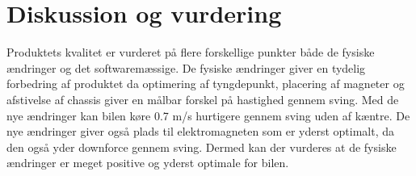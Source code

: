 \section{Diskussion og vurdering}
Produktets kvalitet er vurderet på flere forskellige punkter både de fysiske ændringer og det softwaremæssige. De fysiske ændringer giver en tydelig forbedring af produktet da optimering af tyngdepunkt, placering af magneter og afstivelse af chassis giver en målbar forskel på hastighed gennem sving. Med de nye ændringer kan bilen køre 0.7 m/s hurtigere gennem sving uden af kæntre. De nye ændringer giver også plads til elektromagneten som er yderst optimalt, da den også yder downforce gennem sving. Dermed kan der vurderes at de fysiske ændringer er meget positive og yderst optimale for bilen. 